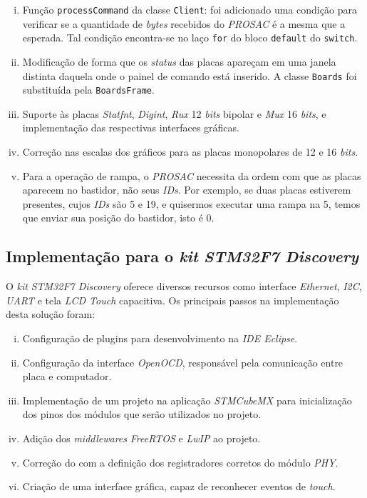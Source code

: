 \begin {enumerate} [i.] 
  \item Função \texttt{processCommand} da classe \texttt{Client}: foi adicionado
  uma condição para verificar se a quantidade de \textit{bytes} recebidos do
  \textit{PROSAC} é a mesma que a esperada. Tal condição encontra-se no laço
  \texttt{for} do bloco \texttt{default} do \texttt{switch}.

  \item Modificação de forma que os \textit{status} das placas apareçam em uma
  janela distinta daquela onde o painel de comando está inserido. A classe
  \texttt{Boards} foi substituída pela \texttt{BoardsFrame}.
  
  \item Suporte às placas \textit{Statfnt}, \textit{Digint}, \textit{Rux} 12
  \textit{bits} bipolar e \textit{Mux} 16 \textit{bits}, e implementação das
  respectivas interfaces gráficas.

  \item Correção nas escalas dos gráficos para as placas monopolares de 12 e 16
  \textit{bits}.
  
  \item Para a operação de rampa, o \textit{PROSAC} necessita da ordem com que
  as placas aparecem no bastidor, não seus \textit{IDs}. Por exemplo, se duas
  placas estiverem presentes, cujos \textit{IDs} são 5 e 19, e quisermos
  executar uma rampa na 5, temos que enviar sua posição do bastidor, isto é 0.

\end{enumerate}

\subsection {Implementação para o \textit{kit} \textit{STM32F7 Discovery}}

O \textit{kit} \textit{STM32F7 Discovery} oferece diversos recursos
como interface \textit{Ethernet}, \textit{I2C}, \textit{UART} e tela
\textit{LCD Touch} capacitiva. Os principais passos na implementação desta
solução foram:

\begin{enumerate} [i.]
  \item Configuração de plugins para desenvolvimento na \textit{IDE Eclipse}.
  \item Configuração da interface \textit{OpenOCD}, responsável pela comunicação
  entre placa e computador.
  \item Implementação de um projeto na aplicação \textit{STMCubeMX} para
  inicialização dos pinos dos módulos que serão utilizados no projeto.
  \item Adição dos \textit{middlewares} \textit{FreeRTOS} e \textit{LwIP} ao
  projeto.
  \item Correção do  com a definição dos
  registradores corretos do módulo \textit{PHY}.
  \item Criação de uma interface gráfica, capaz de reconhecer
  eventos de \textit{touch}.
\end{enumerate}

